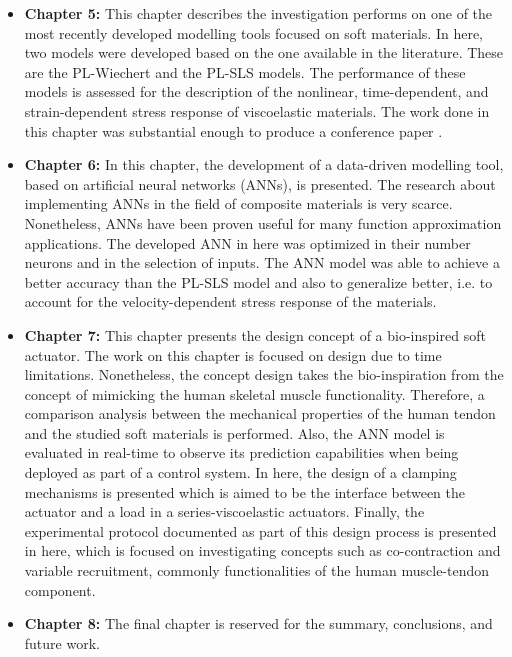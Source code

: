 \begin{itemize}
    \item {\bf Chapter 5: } This chapter describes the investigation performs on one of the most recently developed modelling tools focused on soft materials. In here, two models were developed based on the one available in the literature. These are the PL-Wiechert and the PL-SLS models. The performance of these models is assessed for the description of the nonlinear, time-dependent, and strain-dependent stress response of viscoelastic materials. The work done in this chapter was substantial enough to produce a conference paper \cite{solis2018assessment}.
    \item {\bf Chapter 6: } In this chapter, the development of a data-driven modelling tool, based on artificial neural networks (ANNs), is presented. The research about implementing ANNs in the field of composite materials is very scarce. Nonetheless, ANNs have been proven useful for many function approximation applications. The developed ANN in here was optimized in their number neurons and in the selection of inputs. The ANN model was able to achieve a better accuracy than the PL-SLS model and also to generalize better, i.e. to account for the velocity-dependent stress response of the materials.
    \item {\bf Chapter 7: } This chapter presents the design concept of a bio-inspired soft actuator. The work on this chapter is focused on design due to time limitations. Nonetheless, the concept design takes the bio-inspiration from the concept of mimicking the human skeletal muscle functionality. Therefore, a comparison analysis between the mechanical properties of the human tendon and the studied soft materials is performed. Also, the ANN model is evaluated in real-time to observe its prediction capabilities when being deployed as part of a control system. In here, the design of a clamping mechanisms is presented which is aimed to be the interface between the actuator and a load in a series-viscoelastic actuators. Finally, the experimental protocol documented as part of this design process is presented in here, which is focused on investigating concepts such as co-contraction and variable recruitment, commonly functionalities of the human muscle-tendon component.
    \item {\bf Chapter 8: } The final chapter is reserved for the summary, conclusions, and future work.
\end{itemize}